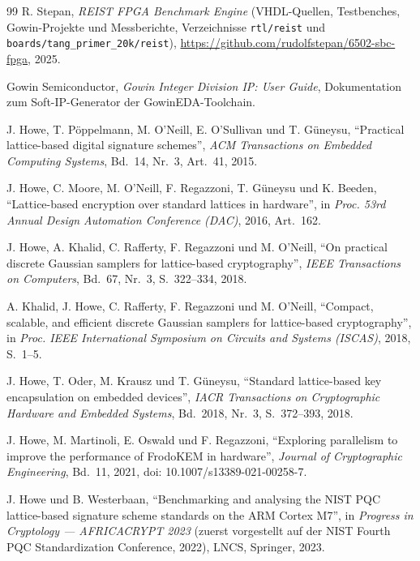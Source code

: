 \documentclass[11pt,a4paper]{scrartcl}
\theoremstyle{definition}
\theoremstyle{plain}
\theoremstyle{remark}
\begin{document}
\begin{thebibliography}{99}
 R. Stepan, \emph{REIST FPGA Benchmark Engine} (VHDL-Quellen, Testbenches, Gowin-Projekte und Messberichte, Verzeichnisse \texttt{rtl/reist} und \texttt{boards/tang\_primer\_20k/reist}), \url{https://github.com/rudolfstepan/6502-sbc-fpga}, 2025.

 Gowin Semiconductor, \emph{Gowin Integer Division IP: User Guide}, Dokumentation zum Soft-IP-Generator der GowinEDA-Toolchain.

 J. Howe, T. P\"oppelmann, M. O'Neill, E. O'Sullivan und T. G\"uneysu, \enquote{Practical lattice-based digital signature schemes}, \emph{ACM Transactions on Embedded Computing Systems}, Bd.~14, Nr.~3, Art.~41, 2015.

 J. Howe, C. Moore, M. O'Neill, F. Regazzoni, T. G\"uneysu und K. Beeden, \enquote{Lattice-based encryption over standard lattices in hardware}, in \emph{Proc. 53rd Annual Design Automation Conference (DAC)}, 2016, Art.~162.

 J. Howe, A. Khalid, C. Rafferty, F. Regazzoni und M. O'Neill, \enquote{On practical discrete Gaussian samplers for lattice-based cryptography}, \emph{IEEE Transactions on Computers}, Bd.~67, Nr.~3, S.~322--334, 2018.

 A. Khalid, J. Howe, C. Rafferty, F. Regazzoni und M. O'Neill, \enquote{Compact, scalable, and efficient discrete Gaussian samplers for lattice-based cryptography}, in \emph{Proc. IEEE International Symposium on Circuits and Systems (ISCAS)}, 2018, S.~1--5.

 J. Howe, T. Oder, M. Krausz und T. G\"uneysu, \enquote{Standard lattice-based key encapsulation on embedded devices}, \emph{IACR Transactions on Cryptographic Hardware and Embedded Systems}, Bd.~2018, Nr.~3, S.~372--393, 2018.

 J. Howe, M. Martinoli, E. Oswald und F. Regazzoni, \enquote{Exploring parallelism to improve the performance of FrodoKEM in hardware}, \emph{Journal of Cryptographic Engineering}, Bd.~11, 2021, doi: 10.1007/s13389-021-00258-7.

 J. Howe und B. Westerbaan, \enquote{Benchmarking and analysing the NIST PQC lattice-based signature scheme standards on the ARM Cortex M7}, in \emph{Progress in Cryptology --- AFRICACRYPT 2023} (zuerst vorgestellt auf der NIST Fourth PQC Standardization Conference, 2022), LNCS, Springer, 2023.

\end{thebibliography}
\end{document}
